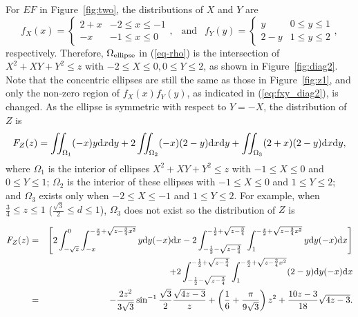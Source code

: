 \documentclass[12pt,draftclsnofoot,onecolumn]{IEEEtran}
\begin{document}
For $EF$ in Figure~\ref{fig:two}, the distributions of $X$ and $Y$ are
\begin{equation}\label{eq:fxy_diag2}
  f_X(x)=\left\{
    \begin{array}{lr}
      2+x & -2\leq x \leq -1 \\
      -x & -1 \leq x \leq 0
    \end{array}
  \right.,
  ~~\mbox{ and }~~ f_Y(y)=\left\{
    \begin{array}{lr}
      y & 0\leq y \leq 1 \\
      2-y & 1 \leq y \leq 2
    \end{array}
  \right.,
\end{equation}
respectively. Therefore, $\Omega_{\rm ellipse}$ in (\ref{eq-rho}) 
is the intersection of $X^2+XY+Y^2 \leq z$ with $-2 \leq X \leq 0, 
0\leq Y \leq 2$, as shown in Figure~\ref{fig:diag2}. 
Note that the concentric ellipses are still 
the same as those in Figure~\ref{fig:z1}, and only the non-zero 
region of $f_X(x)f_Y(y)$, as indicated in (\ref{eq:fxy_diag2}), 
is changed. 
As the ellipse is symmetric with respect to $Y=-X$, the distribution of $Z$ is
\begin{equation}\label{eq:fz_shortdiag}
 F_Z(z)=\iint_{\Omega_1}(-x)y{\rm d}x{\rm d}y+2\iint_{\Omega_2}(-x)(2-y){\rm
d}x{\rm d}y+\iint_{\Omega_3}(2+x)(2-y){\rm d}x{\rm d}y,
\end{equation}
where $\Omega_1$ is the interior of ellipses $X^2+XY+Y^2 \leq z$ with $-1 \leq X
\leq 0$ and $0 \leq Y \leq 1$; $\Omega_2$ is the interior of these ellipses with
$-1 \leq X \leq 0$ and $1 \leq Y \leq 2$; and $\Omega_3$ exists only when $-2 \leq X \leq
-1$ and $1 \leq Y \leq 2$.
For example, when $\frac{3}{4} \leq z \leq 1$ ($\frac{\sqrt{3}}{2} \leq d \leq 1$),
$\Omega_3$ does not exist so the distribution of $Z$ is
\begin{small}
 \begin{eqnarray}\label{eq:Z2_r_diag2}
 F_Z(z)&=&\left[2\int_{-\sqrt{z}}^0\int_{-x}^{-\frac{x}{2}+\sqrt{z-\frac{3}{4}
x^2}}y{\rm d}y(-x){\rm
d}x-2\int_{-\frac{1}{2}-\sqrt{z-\frac{3}{4}}}^{-\frac{1}{2}+\sqrt{
z-\frac{3}{4}}}\int_1^{-\frac{x}{2}+\sqrt{z-\frac{3}{4}x^2}}y{\rm d}y(-x){\rm
d}x\right] \nonumber\\
&&+2\int_{-\frac{1}{2}-\sqrt{z-\frac{3}{4}}}^{-\frac{1}{2}+\sqrt{z-\frac{3}{4}}}
\int_1^{-\frac{x}{2}+\sqrt{z-\frac{3}{4}x^2}}(2-y){\rm d}y(-x){\rm d}x
\nonumber\\
&=&-\frac{2z^2}{3\sqrt{3}}\sin^{-1}\frac{\sqrt{3}}{2}\frac{\sqrt{4z-3}}{z}
+\left(\frac{1}{6}+\frac{\pi}{9\sqrt{3}}\right)z^2+\frac{10z-3}{18}\sqrt{4z-3}.
\end{eqnarray}
\end{small}
\end{document}
